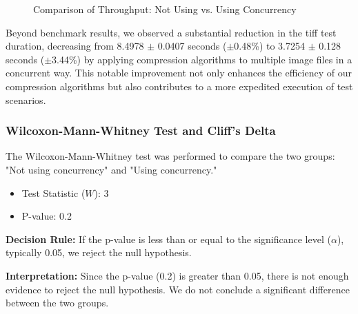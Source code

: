 \documentclass[sigconf]{acmart}
\begin{document}
\begin{figure}
  \centering
  \caption{Comparison of Throughput: Not Using vs. Using Concurrency}
  \label{fig:bargraph}
\end{figure}


\FloatBarrier
Beyond benchmark results, we observed a substantial reduction in the tiff test duration, decreasing from 8.4978 $\pm$ 0.0407 seconds ($\pm$0.48\%) to 3.7254 $\pm$ 0.128 seconds ($\pm$3.44\%) by applying compression algorithms to multiple image files in a concurrent way. This notable improvement not only enhances the efficiency of our compression algorithms but also contributes to a more expedited execution of test scenarios.

\subsubsection{Wilcoxon-Mann-Whitney Test and Cliff's Delta}

The Wilcoxon-Mann-Whitney test was performed to compare the two groups: "Not using concurrency" and "Using concurrency."

\begin{itemize}
    \item Test Statistic ($W$): 3
    \item P-value: 0.2
\end{itemize}

\textbf{Decision Rule:} If the p-value is less than or equal to the significance level (\(\alpha\)), typically 0.05, we reject the null hypothesis.

\textbf{Interpretation:} Since the p-value (0.2) is greater than 0.05, there is not enough evidence to reject the null hypothesis. We do not conclude a significant difference between the two groups.
\end{document}
